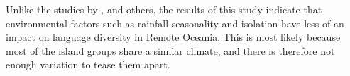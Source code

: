 \documentclass[12pt,letterpaper]{article}
\begin{document}

Unlike the studies by \citet{gavin2012island}, \citet{hua2019ecological} and others, the results of this study indicate that environmental factors such as rainfall seasonality and isolation have less of an impact on language diversity in Remote Oceania. This is most likely because most of the island groups share a similar climate, and there is therefore not enough variation to tease them apart.


\end{document}
